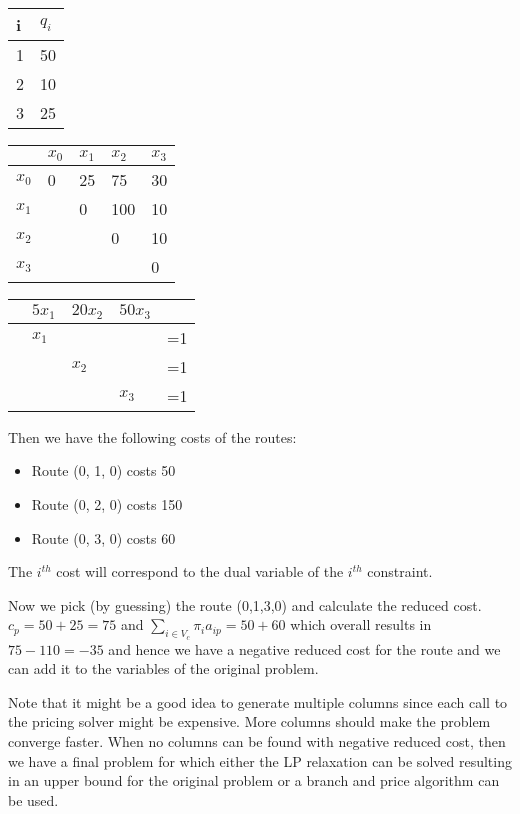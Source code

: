 \begin{table}[H]
\begin{tabular}{|l|l|}
	\hline
	i & $q_i$    \\\hline
	1 & 50       \\\hline
	2 & 10       \\\hline
	3 & 25       \\\hline
\end{tabular}
\quad
\begin{tabular}{|l|llll|}
	\hline
	& $ x_0 $   & $ x_1 $ & $ x_2 $ & $ x_3 $ \\\hline
	$ x_0 $ & 0         & 25      & 75      & 30  \\
	$ x_1 $ &           & 0       & 100     & 10  \\
	$ x_2 $ &           &         & 0       & 10  \\
	$ x_3 $ &           &         &         & 0  \\
	\hline
\end{tabular}
\quad
\begin{tabular}{|lllll|}
	\hline
	& $5x_1$ & $20x_2$ & $50x_3$ &    \\\hline
	& $x_1$  &         &         & =1 \\
	&        & $x_2$   &         & =1 \\
	&        &         & $x_3$   & =1 \\\hline
\end{tabular}
\end{table}

Then we have the following costs of the routes:

\begin{itemize}
\item[] Route (0, 1, 0) costs 50
\item[] Route (0, 2, 0) costs 150
\item[] Route (0, 3, 0) costs 60
\end{itemize}
The $i^{th}$ cost will correspond to the dual variable of the $i^{th}$ constraint.

Now we pick (by guessing) the route (0,1,3,0) and calculate the reduced cost. $c_p = 50+25=75$ and $\sum_{i\in V_c} \pi_i a_{ip} = 50+60 $ which overall results in $75-110 = -35$ and hence we have a negative reduced cost for the route and we can add it to the variables of the original problem.

\newpar Note that it might be a good idea to generate multiple columns since each call to the pricing solver might be expensive. More columns should make the problem converge faster. When no columns can be found with negative reduced cost, then we have a final problem for which either the LP relaxation can be solved resulting in an upper bound for the original problem or a branch and price algorithm can be used.

